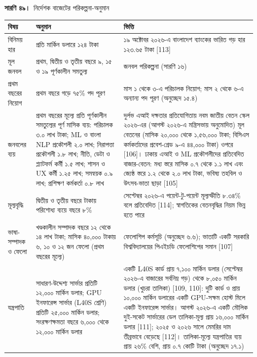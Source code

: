 \documentclass[border=10pt]{standalone}
\begin{document}
\begin{minipage}{17cm}
{\large\bfseries সারণি ৪৯।}\ {\large নির্দেশক বাজেটের পরিকল্পনা-অনুমান}\par\vspace{7pt}
\small
{}
\begin{tabularx}{\linewidth}{@{}>{\hsize=0.679\hsize\raggedright\arraybackslash}X>{\hsize=1.286\hsize\raggedright\arraybackslash}X>{\hsize=1.036\hsize\raggedright\arraybackslash}X@{}}
\arrayrulecolor{bapilrule}\toprule
\rowcolor{white}\textbf{বিষয়} & \textbf{অনুমান} & \textbf{ভিত্তি} \\
\midrule
বিনিময় হার & প্রতি মার্কিন ডলারে ১২৪ টাকা & ১৯ অক্টোবর ২০২৬-এ বাংলাদেশ ব্যাংকের ভারিত গড় হার ১২৩.৬৫ টাকা [113] \\
মূল জনবল & প্রথম, দ্বিতীয় ও তৃতীয় বছরে ৯, ১৫ ও ১৯ পূর্ণকালীন সমতুল্য & জনবল পরিকল্পনা (সারণি ১৬) \\
প্রথম বছরের নিয়োগ & প্রথম বছরে গড়ে ৭৫\% পদ পূরণ & মাস ১ থেকে ৩-এ পরিচালক নিয়োগ; মাস ২ থেকে ৬-এ অন্যান্য পদ পূরণ (অনুচ্ছেদ ১৫.৪) \\
জনবলের ব্যয় & প্রথম বছরের মূল্যে প্রতি পূর্ণকালীন সমতুল্যের পূর্ণ মাসিক ব্যয়: পরিচালক ৩.০ লাখ টাকা; ML ও বাংলা NLP প্রকৌশলী ২.০ লাখ; নিরাপত্তা প্রকৌশলী ১.৮ লাখ; নীতি, ডেটা ও প্ল্যাটফর্ম কর্মী ১.৫ লাখ; শাসন ও UX কর্মী ১.২৫ লাখ; সমন্বয়ক ০.৯ লাখ; প্রশিক্ষণ কর্মকর্তা ০.৮ লাখ & দুর্লভ এআই দক্ষতার প্রতিযোগিতায় নবম জাতীয় বেতন স্কেল ২০২৬-এর (আগস্ট ২০২৬-এ মন্ত্রিসভায় অনুমোদিত) মূল বেতনের (মাসিক ২০,০০০ থেকে ১,৫৬,০০০ টাকা; বিসিএস কর্মকর্তাদের প্রবেশ-গ্রেড ৯-এ ৪৪,০০০ টাকা) ওপরে [106]। ঢাকায় এআই ও ML প্রকৌশলীদের প্রতিবেদিত বাজার-বেতন: মধ্য স্তরে মাসিক ০.৭ থেকে ১.১ লাখ এবং জ্যেষ্ঠ স্তরে ১.২ থেকে ২.০ লাখ টাকা, ভবিষ্য তহবিল ও উৎসব-ভাতা ছাড়া [105] \\
মূল্যবৃদ্ধি & দ্বিতীয় ও তৃতীয় বছরে টাকায় পরিশোধ্য ব্যয়ে বছরে ৮\% & সেপ্টেম্বর ২০২৬-এ পয়েন্ট-টু-পয়েন্ট মূল্যস্ফীতি ৮.৩৪\% বলে প্রতিবেদিত [114]; স্বাগতিকের বেতনবৃদ্ধির নিয়ম ভিন্ন হতে পারে \\
ভাষা-সম্পাদক ও ফেলো & খণ্ডকালীন সম্পাদক বছরে ১২ থেকে ১৪ লাখ টাকা; মাসিক ৪০,০০০ টাকায় ৬, ১০ ও ১২ জন ফেলো (প্রথম বছরের মূল্যে) & ফেলোশিপ কর্মসূচি (অনুচ্ছেদ ৬.৬); ভাতাটি একটি সরকারি বিশ্ববিদ্যালয়ের পিএইচডি ফেলোশিপের সমান [107] \\
যন্ত্রপাতি & সাধারণ-উদ্দেশ্য সার্ভার প্রতিটি ১২,০০০ মার্কিন ডলার; GPU ইনফারেন্স সার্ভার (L40S শ্রেণি) প্রতিটি ২৫,০০০ মার্কিন ডলার; সংরক্ষণক্ষমতা বছরে ৬,০০০ থেকে ১২,০০০ মার্কিন ডলার & একটি L40S কার্ড প্রায় ৭,১০০ মার্কিন ডলার (সেপ্টেম্বর ২০২৬-এ বাজারের সর্বনিম্ন গড়) থেকে ৮,০৫০ মার্কিন ডলার (খুচরা তালিকা) [109, 110]: দুটি কার্ড ও প্রায় ১০,০০০ মার্কিন ডলারের একটি GPU-সক্ষম হোস্ট মিলে একটি ইনফারেন্স সার্ভার। আগস্ট ২০২৬-এ একটি মৌলিক দুই-সকেট সার্ভারের ডেল তালিকা-মূল্য প্রায় ১৬,০০০ মার্কিন ডলার [111]; ২০২৫ ও ২০২৬ সালে মেমরির দাম তীব্রভাবে বেড়েছে [112]। তালিকা-মূল্যে যন্ত্রপাতির ব্যয় প্রায় ২৬\% বেশি, প্রায় ০.৭ কোটি টাকা (অনুচ্ছেদ ১৭.১) \\

\end{tabularx}
\end{minipage}
\end{document}

